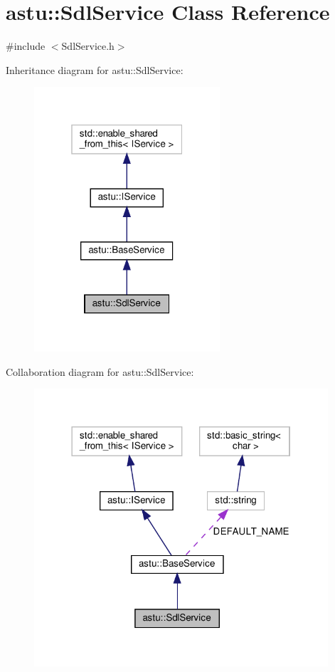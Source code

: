 \hypertarget{classastu_1_1SdlService}{}\section{astu\+:\+:Sdl\+Service Class Reference}
\label{classastu_1_1SdlService}


{\ttfamily \#include $<$Sdl\+Service.\+h$>$}



Inheritance diagram for astu\+:\+:Sdl\+Service\+:\nopagebreak
\begin{figure}[H]
\begin{center}
\leavevmode
\includegraphics[width=196pt]{classastu_1_1SdlService__inherit__graph}
\end{center}
\end{figure}


Collaboration diagram for astu\+:\+:Sdl\+Service\+:\nopagebreak
\begin{figure}[H]
\begin{center}
\leavevmode
\includegraphics[width=310pt]{classastu_1_1SdlService__coll__graph}
\end{center}
\end{figure}
